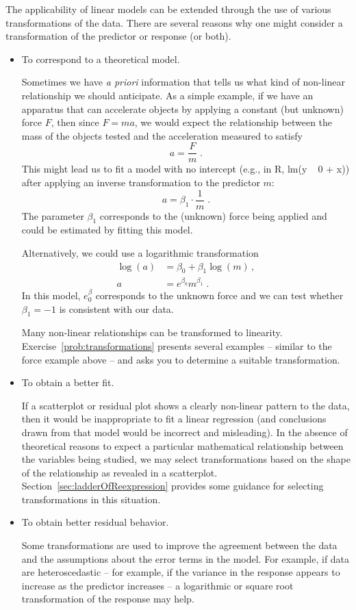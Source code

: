 \documentclass[twoside]{book}\usepackage[]{graphicx}\usepackage[]{xcolor}
\newcounter{example}[section]
\begin{document}
The applicability of linear models can be extended through the use of 
various transformations of the data.  
There are several reasons why one might consider a transformation of
the predictor or response (or both).

\begin{itemize}
  \item To correspond to a theoretical model.

	Sometimes we have \emph{a priori} information that tells us what 
	kind of non-linear relationship we should anticipate.  As a simple example,
	if we have an apparatus that can accelerate objects by applying a constant
	(but unknown) force $F$, 
	then since $F = ma$, we would expect the relationship between 
	the mass of the objects tested and the acceleration measured to satisfy
	\[
	a = \frac{F}{m}
	\;.
	\]
	This might lead us to fit a model with no intercept 
	(e.g., in R, lm(y ~ 0 + x)) after applying an inverse transformation
	to the predictor $m$:
	\[
	a = \beta_1 \cdot \frac{1}{m}
	\;.
	\]
	The parameter $\beta_1$ corresponds to the (unknown) force being applied
	and could be estimated by fitting this model.

	Alternatively, we could use a logarithmic transformation
	\begin{align*}
	\log(a) &= \beta_0 + \beta_1 \log(m) \,,
	\\
	a &= e^{\beta_0}  m^{\beta_1}  \;.
	\end{align*}
	In this model, $e^\beta_0$ corresponds to the unknown force and 
	we can test whether $\beta_1 = -1$ is consistent with our data.

	Many non-linear relationships can be transformed to linearity.  
	Exercise~\ref{prob:transformations} presents several examples -- similar to the force example above --
	and asks you to determine a suitable transformation.

  \item To obtain a better fit.

	If a scatterplot or residual plot shows a clearly non-linear pattern 
	to the data, then it would be inappropriate to fit a linear regression (and conclusions drawn from that model would be incorrect and misleading).  
	In the absence of theoretical reasons to expect a particular mathematical relationship between the variables being studied, we may select 
	transformations based on the shape of the relationship as 
	revealed in a scatterplot.  Section~\ref{sec:ladderOfReexpression}
	provides some guidance for selecting transformations in
	this situation.

  \item To obtain better residual behavior.

	Some transformations are used to improve the agreement between the
	data and the assumptions about the error terms in the model.  For example, if data are heteroscedastic -- for example, if the variance in the response appears to increase as the predictor 
	increases -- a logarithmic or square root transformation of the response may help.  
\end{itemize}
\end{document}
